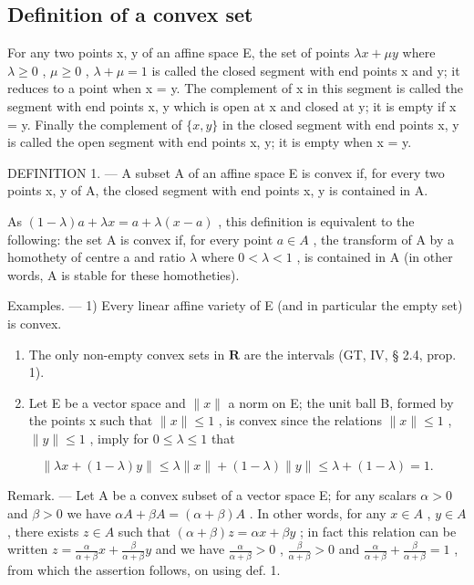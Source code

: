 \subsection{Definition of a convex set}

For any two points x, y of an affine space E, the set of points \(\lambda x + \mu y\) where \(\lambda \geqslant 0\) , \(\mu \geqslant 0\) , \(\lambda + \mu = 1\) is called the closed segment with end points x and y; it reduces to a point when x = y. The complement of x in this segment is called the segment with end points x, y which is open at x and closed at y; it is empty if x = y. Finally the complement of \(\{x, y\}\) in the closed segment with end points x, y is called the open segment with end points x, y; it is empty when x = y.

DEFINITION 1. --- A subset A of an affine space E is convex if, for every two points x, y of A, the closed segment with end points x, y is contained in A.

As \((1 - \lambda)a + \lambda x = a + \lambda(x - a)\) , this definition is equivalent to the following: the set A is convex if, for every point \(a \in A\) , the transform of A by a homothety of centre a and ratio \(\lambda\) where \(0 < \lambda < 1\) , is contained in A (in other words, A is stable for these homotheties).

Examples. --- 1) Every linear affine variety of E (and in particular the empty set) is convex.

\begin{enumerate}
\def\labelenumi{\arabic{enumi})}
\setcounter{enumi}{1}
\item
  The only non-empty convex sets in \(\mathbf{R}\) are the intervals (GT, IV, § 2.4, prop. 1).
\item
  Let E be a vector space and \(\|x\|\) a norm on E; the unit ball B, formed by the points x such that \(\| x\| \leqslant 1\) , is convex since the relations \(\| x\| \leqslant 1\) , \(\| y\| \leqslant 1\) , imply for \(0\leqslant \lambda \leqslant 1\) that
\end{enumerate}

\[
\left\| \lambda x + (1 - \lambda) y \right\| \leqslant \lambda \| x \| + (1 - \lambda) \| y \| \leqslant \lambda + (1 - \lambda) = 1.
\]

Remark. --- Let A be a convex subset of a vector space E; for any scalars \(\alpha > 0\) and \(\beta > 0\) we have \(\alpha A + \beta A = (\alpha + \beta) A\) . In other words, for any \(x \in A\) , \(y \in A\) , there exists \(z \in A\) such that \((\alpha + \beta) z = \alpha x + \beta y\) ; in fact this relation can be written \(z = \frac{\alpha}{\alpha + \beta} x + \frac{\beta}{\alpha + \beta} y\) and we have \(\frac{\alpha}{\alpha + \beta} > 0\) , \(\frac{\beta}{\alpha + \beta} > 0\) and \(\frac{\alpha}{\alpha + \beta} + \frac{\beta}{\alpha + \beta} = 1\) , from which the assertion follows, on using def. 1.

